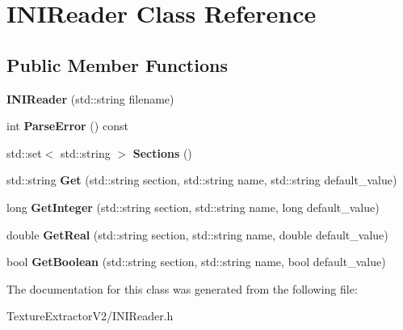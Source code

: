 \hypertarget{class_i_n_i_reader}{}\section{I\+N\+I\+Reader Class Reference}
\label{class_i_n_i_reader}
\subsection*{Public Member Functions}
\begin{DoxyCompactItemize}
\item 
\hypertarget{class_i_n_i_reader_a357e21f6b1bc10b17bd3a7b72452cb57}{}{\bfseries I\+N\+I\+Reader} (std\+::string filename)\label{class_i_n_i_reader_a357e21f6b1bc10b17bd3a7b72452cb57}

\item 
\hypertarget{class_i_n_i_reader_aa40b260538dc123ef43fd07d86f0b729}{}int {\bfseries Parse\+Error} () const \label{class_i_n_i_reader_aa40b260538dc123ef43fd07d86f0b729}

\item 
\hypertarget{class_i_n_i_reader_a8dc6b10ba3415f3c30c30c4fc342d867}{}std\+::set$<$ std\+::string $>$ {\bfseries Sections} ()\label{class_i_n_i_reader_a8dc6b10ba3415f3c30c30c4fc342d867}

\item 
\hypertarget{class_i_n_i_reader_a1042bfbb483afa305283a6f1a2bf27e9}{}std\+::string {\bfseries Get} (std\+::string section, std\+::string name, std\+::string default\+\_\+value)\label{class_i_n_i_reader_a1042bfbb483afa305283a6f1a2bf27e9}

\item 
\hypertarget{class_i_n_i_reader_a5fb288f961b8a43ba4974fbf97f4d1df}{}long {\bfseries Get\+Integer} (std\+::string section, std\+::string name, long default\+\_\+value)\label{class_i_n_i_reader_a5fb288f961b8a43ba4974fbf97f4d1df}

\item 
\hypertarget{class_i_n_i_reader_add45ae10b48fd12cb98a7b73e67d3a77}{}double {\bfseries Get\+Real} (std\+::string section, std\+::string name, double default\+\_\+value)\label{class_i_n_i_reader_add45ae10b48fd12cb98a7b73e67d3a77}

\item 
\hypertarget{class_i_n_i_reader_ac3d70858d357a6797b0d58a9a00d737e}{}bool {\bfseries Get\+Boolean} (std\+::string section, std\+::string name, bool default\+\_\+value)\label{class_i_n_i_reader_ac3d70858d357a6797b0d58a9a00d737e}

\end{DoxyCompactItemize}


The documentation for this class was generated from the following file\+:\begin{DoxyCompactItemize}
\item 
Texture\+Extractor\+V2/I\+N\+I\+Reader.\+h\end{DoxyCompactItemize}
